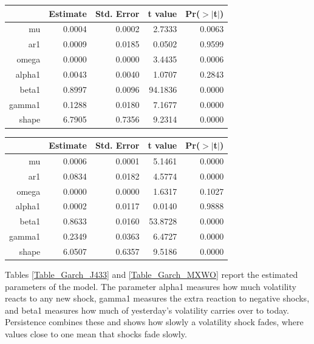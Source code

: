 \documentclass[11pt,preprint, authoryear]{elsarticle}
\let\origtable\table
\let\endorigtable\endtable
\renewenvironment{table}[1][2] {
    \expandafter\origtable\expandafter[H]
} {
    \endorigtable
}
\numberwithin{equation}{section}
\numberwithin{figure}{section}
\numberwithin{table}{section}
\begin{document}
\begin{table}[H]
\centering
\begin{tabular}{rrrrr}
  \hline
 &  Estimate &  Std. Error &  t value & Pr($>$$|$t$|$) \\ 
  \hline
mu & 0.0004 & 0.0002 & 2.7333 & 0.0063 \\ 
  ar1 & 0.0009 & 0.0185 & 0.0502 & 0.9599 \\ 
  omega & 0.0000 & 0.0000 & 3.4435 & 0.0006 \\ 
  alpha1 & 0.0043 & 0.0040 & 1.0707 & 0.2843 \\ 
  beta1 & 0.8997 & 0.0096 & 94.1836 & 0.0000 \\ 
  gamma1 & 0.1288 & 0.0180 & 7.1677 & 0.0000 \\ 
  shape & 6.7905 & 0.7356 & 9.2314 & 0.0000 \\ 
   \hline
\end{tabular}
\caption{GJR-GARCH(1,1) estimates: Capped SWIX \label{Table_Garch_J433}} 
\end{table}
\begin{table}[H]
\centering
\begin{tabular}{rrrrr}
  \hline
 &  Estimate &  Std. Error &  t value & Pr($>$$|$t$|$) \\ 
  \hline
mu & 0.0006 & 0.0001 & 5.1461 & 0.0000 \\ 
  ar1 & 0.0834 & 0.0182 & 4.5774 & 0.0000 \\ 
  omega & 0.0000 & 0.0000 & 1.6317 & 0.1027 \\ 
  alpha1 & 0.0002 & 0.0117 & 0.0140 & 0.9888 \\ 
  beta1 & 0.8633 & 0.0160 & 53.8728 & 0.0000 \\ 
  gamma1 & 0.2349 & 0.0363 & 6.4727 & 0.0000 \\ 
  shape & 6.0507 & 0.6357 & 9.5186 & 0.0000 \\ 
   \hline
\end{tabular}
\caption{GJR-GARCH(1,1) estimates: MSCI World \label{Table_Garch_MXWO}} 
\end{table}

Tables \ref{Table_Garch_J433} and \ref{Table_Garch_MXWO} report the
estimated parameters of the model. The parameter alpha1 measures how
much volatility reacts to any new shock, gamma1 measures the extra
reaction to negative shocks, and beta1 measures how much of yesterday's
volatility carries over to today. Persistence combines these and shows
how slowly a volatility shock fades, where values close to one mean that
shocks fade slowly.
\end{document}
